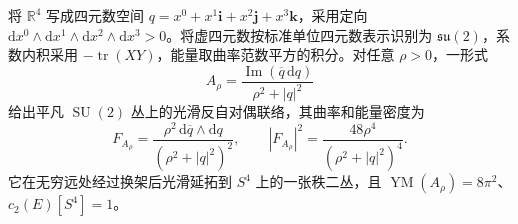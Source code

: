 \begin{example}\label{g3:exm:B-bpst-instanton}
	将 \(\mathbb R^4\) 写成四元数空间
	\(q=x^0+x^1\mathbf i+x^2\mathbf j+x^3\mathbf k\)，采用定向
	\(\mathrm dx^0\wedge\mathrm dx^1\wedge\mathrm dx^2\wedge\mathrm dx^3>0\)。将虚四元数按标准单位四元数表示识别为 \(\mathfrak{su}(2)\)，系数内积采用 \(-\operatorname{tr}(XY)\)，能量取曲率范数平方的积分。对任意 \(\rho>0\)，一形式
	\begin{equation}\label{g3:eq:B-bpst-connection}
		A_\rho=\frac{\operatorname{Im}(\overline q\,\mathrm dq)}
		                   {\rho^2+|q|^2}
	\end{equation}
	给出平凡 \(\operatorname{SU}(2)\) 丛上的光滑反自对偶联络，其曲率和能量密度为
	\begin{equation}\label{g3:eq:B-bpst-curvature-density}
		F_{A_\rho}=\frac{\rho^2\,\mathrm d\overline q\wedge\mathrm dq}
		                        {(\rho^2+|q|^2)^2},
		\qquad
		|F_{A_\rho}|^2=\frac{48\rho^4}{(\rho^2+|q|^2)^4}.
	\end{equation}
	它在无穷远处经过换架后光滑延拓到 \(S^4\) 上的一张秩二丛，且
	\(\operatorname{YM}(A_\rho)=8\pi^2\)、\(c_2(E)[S^4]=1\)。
\end{example}
